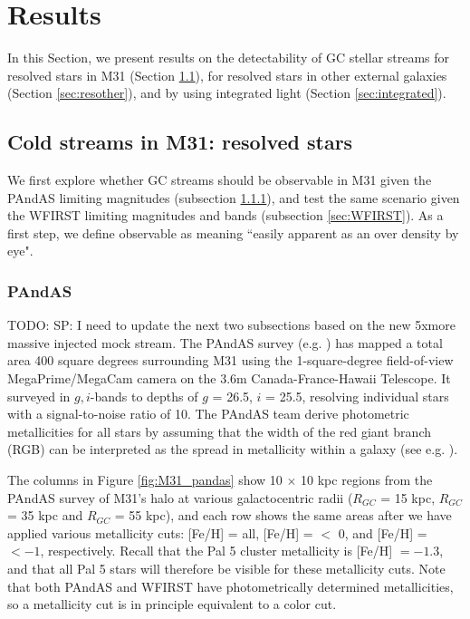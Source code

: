 \documentclass[twocolumn]{aastex62}
\newcommand{\todo}[1]{{\color{red} TODO: #1}}
\begin{document}
\section{Results}\label{sec:results}
In this Section, we present results on the detectability of GC stellar streams for resolved stars in M31 (Section \ref{sec:resolved}), for resolved stars in other external galaxies (Section \ref{sec:resother}), and by using integrated light (Section \ref{sec:integrated}). 
 

\subsection{Cold streams in M31: resolved stars}
\label{sec:resolved}
We first explore whether GC streams should be observable in M31 given the PAndAS limiting magnitudes (subsection \ref{sec:PANDAS}), and test the same scenario given the WFIRST limiting magnitudes and bands (subsection \ref{sec:WFIRST}). As a first step, we define observable as meaning ``easily apparent as an over density by eye".%


\subsubsection{PAndAS}
\label{sec:PANDAS}
\todo{SP: I need to update the next two subsections based on the new 5xmore massive injected mock stream. }
The PAndAS survey (e.g. \citealt{mcconnachie09}) has mapped a total area 400 square degrees surrounding M31 using the 1-square-degree field-of-view MegaPrime/MegaCam camera on the 3.6m Canada-France-Hawaii Telescope. It surveyed in $g, i$-bands to depths of $g$ = 26.5, $i$ = 25.5, resolving individual stars with a signal-to-noise ratio of 10. The PAndAS team derive photometric metallicities for all stars by assuming that the width of the red giant branch (RGB) can be interpreted as the spread in metallicity within a galaxy (see e.g. \citealt{crno14}).

The columns in Figure \ref{fig:M31_pandas} show 10 $\times$ 10 kpc regions from the PAndAS survey of M31's halo at various galactocentric radii ($R_{GC}$ = 15  kpc, $R_{GC}$ = 35 kpc and $R_{GC}$ = 55 kpc), and each row shows the same areas after we have applied various metallicity cuts: [Fe/H] = all,  [Fe/H] = $<$ 0, and  [Fe/H] = $< -1 $, respectively. Recall that the Pal 5 cluster metallicity is  [Fe/H] $= -1.3$, and that all Pal 5 stars will therefore be visible for these metallicity cuts. Note that both PAndAS and WFIRST have photometrically determined metallicities, so a metallicity cut is in principle equivalent to a color cut.
\end{document}
